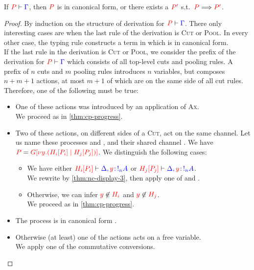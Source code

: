 \begin{theorem}[Progress]\label{thm:nc-progress}
  If $\seq[{ P }]{ \Gamma }$, then $\tm{P}$ is in canonical form, or there
  exists a $\tm{P'}$ s.t.\ $\reducesto{P}{P'}$.
\end{theorem}
\begin{proof}
  By induction on the structure of derivation for $\seq[{ P }]{ \Gamma }$.
  There only interesting cases are when the last rule of the derivation is
  \textsc{Cut} or \textsc{Pool}. In every other case, the typing rule constructs
  a term in which is in canonical form. 
  \\
  If the last rule in the derivation is \textsc{Cut} or \textsc{Pool}, we
  consider the prefix of the derivation for $\seq[{ P }]{ \Gamma}$ which
  consists of all top-level cuts and pooling rules. A prefix of $n$ cuts and $m$
  pooling rules introduces $n$ variables, but composes $n+m+1$ actions, at most
  $m+1$ of which are on the same side of all cut rules.
  Therefore, one of the following must be true:
  \begin{itemize}
  \item
    One of these actions was introduced by an application of \textsc{Ax}.
    \\
    We proceed as in \cref{thm:cp-progress}. 
  \item
    Two of these actions, on different sides of a \textsc{Cut}, act on the same
    channel. Let us name these processes  and , and their shared
    channel . We have
    $\tm{P} = \tm{\cpPlug{G}{\cpCut{y}{\cpPlug{H_i}{P_i}}{\cpPlug{H_j}{P_j}}}}$.
    We distinguish the following cases:
    \begin{itemize}
    \item
      We have either
      $\seq[{ \cpPlug{H_i}{P_i}}]{ \Delta, \tmty{y}{\take[n]{A}} }$ or
      $\seq[{ \cpPlug{H_j}{P_j} }]{\Delta, \tmty{y}{\take[n]{A}} }$.
      \\
      We rewrite by \cref{thm:nc-display-3}, then apply one of 
      and . 
    \item
      Otherwise, we can infer $\notFreeIn{y}{H_i}$ and $\notFreeIn{y}{H_j}$.
      \\
      We proceed as in \cref{thm:cp-progress}. 
    \end{itemize}
  \item
    The process is in canonical form . 
  \item 
    Otherwise (at least) one of the actions acts on a free variable.
    \\
    We apply one of the commutative conversions.
  \end{itemize}
\end{proof}
